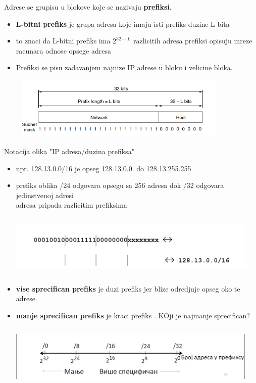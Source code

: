 \documentclass{article} %
\begin{document}
Adrese se grupisu u blokove koje se nazivaju \textbf{prefiksi}.
\begin{itemize}
  \item \textbf{L-bitni prefiks} je grupa adresa koje imaju isti prefiks duzine L bita
 \item to znaci da L-bitni prefiks ima $2^{32-L}$ razlicitih adresa
prefiksi opisuju mreze racunara odnose opsege adresa 
 \item Prefiksi se pisu zadavanjem najnize IP adrese u bloku i velicine bloka.
\end{itemize}
 \begin{center}
\includegraphics[width=12cm, height=3cm]{prefiks}\\
\end{center}
Notacija olika "IP adresa/duzina prefiksa"\\
\begin{itemize}
  \item npr. 128.13.0.0/16 je opseg 128.13.0.0. do 128.13.255.255
  \item prefiks oblika /24 odgovara opsegu sa 256 adresa dok /32 odgovara jedinstvenoj adresi\\
 adresa pripada razlicitim prefiksima
 \begin{center}
\includegraphics[width=12cm, height=3cm]{prefiks2}\\
\end{center}
\item \textbf{vise sprecifican prefiks} je duzi prefiks jer blize odredjuje opseg oko te adrese
\item \textbf{manje sprecifican prefiks} je kraci prefiks . KOji je najmanje sprecifican?
\begin{center}
\includegraphics[width=12cm, height=3cm]{prefiks3}\\
\end{center}
\end{itemize}
\end{document}
